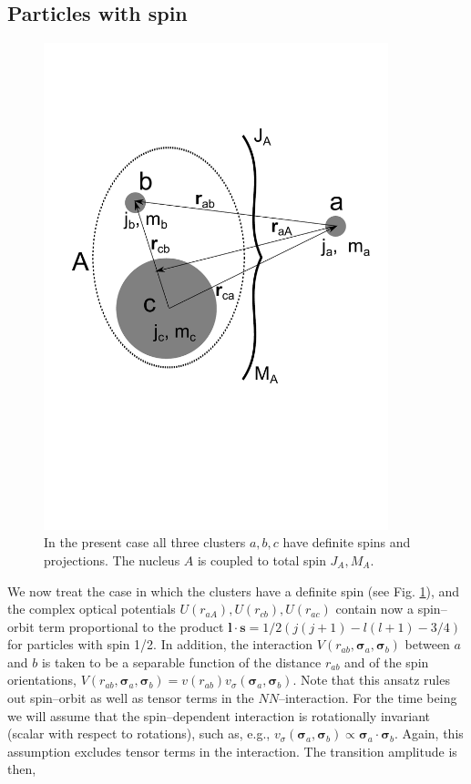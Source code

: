 \begin{subappendices}
\subsection{Particles with spin}
 \begin{figure}
\centerline{\includegraphics*[width=10cm,angle=0]{C6/figs_C6/knock2.pdf}}
\vspace{-4cm}
\caption{In the present case all three clusters $a,b,c$ have definite spins and projections. The nucleus $A$ is coupled to total spin $J_A,M_A$.}\label{figC6AppF3}
\end{figure}
We  now treat  the case in which the clusters have a definite spin (see Fig. \ref{figC6AppF3}),  and the complex  optical potentials $U(r_{aA}),U(r_{cb}),U(r_{ac})$ contain now  a spin--orbit term proportional to the  product $\mathbf l \cdot \mathbf s=1/2(j(j+1)-l(l+1)-3/4)$ for particles with spin 1/2. In addition, the interaction $V(r_{ab},\boldsymbol\sigma_a,\boldsymbol\sigma_b)$ between $a$ and $b$ is taken to be a separable function of the distance $r_{ab}$ and of the spin orientations, $V(r_{ab},\boldsymbol\sigma_a,\boldsymbol\sigma_b)=v(r_{ab})v_\sigma(\boldsymbol\sigma_a,\boldsymbol\sigma_b)$. Note that this ansatz rules out spin--orbit as well as tensor terms in the $NN$--interaction. For the time being we will assume that the spin--dependent interaction is rotationally invariant (scalar with respect to rotations), such as, e.g., $v_\sigma(\boldsymbol\sigma_a,\boldsymbol\sigma_b)\propto\boldsymbol\sigma_a \cdot\boldsymbol\sigma_b$. Again, this assumption excludes tensor terms in the interaction. The transition amplitude is then,

\end{subappendices}

